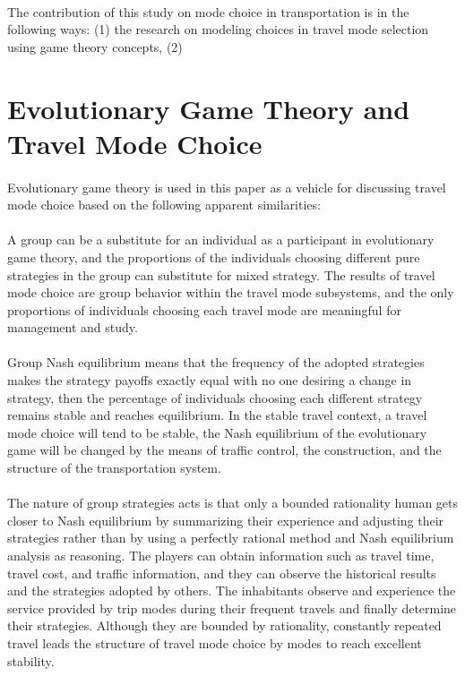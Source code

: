 
\paragraph{}The contribution of this study on mode choice in transportation is in the following ways: 
(1) the research on modeling choices in travel mode selection using game theory concepts, (2) 
\clearpage

\section{Evolutionary Game Theory and Travel Mode Choice}
\paragraph{}Evolutionary game theory is used in this paper as a vehicle for discussing travel mode choice based on the following apparent similarities: 
\paragraph{}A group can be a substitute for an individual as a participant in evolutionary game theory, and the proportions of the individuals choosing different pure strategies in the group can substitute for mixed strategy. The results of travel mode choice are group behavior within the travel mode subsystems, and the only proportions of individuals choosing each travel mode are meaningful for management and study.
\paragraph{}Group Nash equilibrium means that the frequency of the adopted strategies makes the strategy payoffs exactly equal with no one desiring a change in strategy, then the percentage of individuals choosing each different strategy remains stable and reaches equilibrium. In the stable travel context, a travel mode choice will tend to be stable, the Nash equilibrium of the evolutionary game will be changed by the means of traffic control, the construction, and the structure of the transportation system.
\paragraph{}The nature of group strategies acts is that only a bounded rationality human gets closer to Nash equilibrium by summarizing their experience and adjusting their strategies rather than by using a perfectly rational method and Nash equilibrium analysis as reasoning. The players can obtain information such as travel time, travel cost, and traffic information, and they can observe the historical results and the strategies adopted by others. The inhabitants observe and experience the service provided by trip modes during their frequent travels and finally determine their strategies. Although they are bounded by rationality, constantly repeated travel leads the structure of travel mode choice by modes to reach excellent stability.
